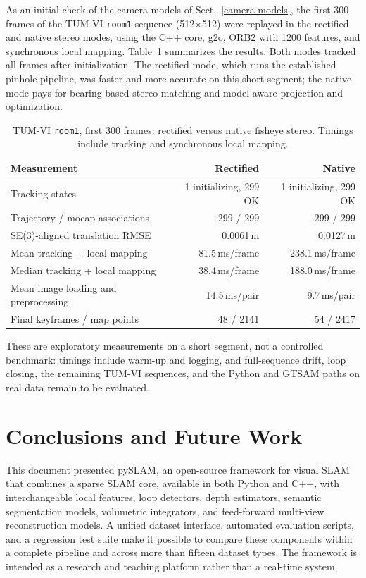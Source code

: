\documentclass{article}
\begin{document}
As an initial check of the camera models of Sect.~\ref{camera-models}, the first 300 frames of the TUM-VI \texttt{room1} sequence (512$\times$512) were replayed in the rectified and native stereo modes, using the C++ core, g2o, ORB2 with 1200 features, and synchronous local mapping. Table~\ref{tab:tumvi_modes} summarizes the results. Both modes tracked all frames after initialization. The rectified mode, which runs the established pinhole pipeline, was faster and more accurate on this short segment; the native mode pays for bearing-based stereo matching and model-aware projection and optimization.

\begin{table}[!ht]
\centering
\caption{TUM-VI \texttt{room1}, first 300 frames: rectified versus native fisheye stereo. Timings include tracking and synchronous local mapping.}
\label{tab:tumvi_modes}
\fontsize{8pt}{9.6pt}\selectfont
\begin{tabular}{lrr}
\toprule
Measurement & Rectified & Native \\
\midrule
Tracking states & 1 initializing, 299 OK & 1 initializing, 299 OK \\
Trajectory / mocap associations & 299 / 299 & 299 / 299 \\
SE(3)-aligned translation RMSE & 0.0061\,m & 0.0127\,m \\
Mean tracking + local mapping & 81.5\,ms/frame & 238.1\,ms/frame \\
Median tracking + local mapping & 38.4\,ms/frame & 188.0\,ms/frame \\
Mean image loading and preprocessing & 14.5\,ms/pair & 9.7\,ms/pair \\
Final keyframes / map points & 48 / 2141 & 54 / 2417 \\
\bottomrule
\end{tabular}
\end{table}

These are exploratory measurements on a short segment, not a controlled benchmark: timings include warm-up and logging, and full-sequence drift, loop closing, the remaining TUM-VI sequences, and the Python and GTSAM paths on real data remain to be evaluated.

\hypertarget{conclusions}{%
\section{Conclusions and Future Work}\label{conclusions}}

This document presented pySLAM, an open-source framework for visual SLAM that combines a sparse SLAM core, available in both Python and C++, with interchangeable local features, loop detectors, depth estimators, semantic segmentation models, volumetric integrators, and feed-forward multi-view reconstruction models. A unified dataset interface, automated evaluation scripts, and a regression test suite make it possible to compare these components within a complete pipeline and across more than fifteen dataset types. The framework is intended as a research and teaching platform rather than a real-time system.
\end{document}
